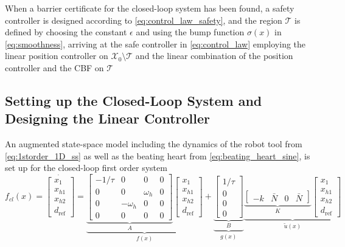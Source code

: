 When a barrier certificate for the closed-loop system has been found, a safety controller is designed according to \autoref{eq:control_law_safety}, and the region $\mathcal{T}$ is defined by choosing the constant $\epsilon$ and using the bump function $\sigma(x)$ in \autoref{eq:smoothness}, arriving at the safe controller in \autoref{eq:control_law} employing the linear position controller on $\mathcal{X}_0\setminus\mathcal{T}$ and the linear combination of the position controller and the CBF on $\mathcal{T}$

\subsection{Setting up the Closed-Loop System and Designing the Linear Controller}
An augmented state-space model including the dynamics of the robot tool from \autoref{eq:1storder_1D_ss} as well as the beating heart from \autoref{eq:beating_heart_sine}, is set up for the closed-loop first order system
\begin{equation}
f_{cl}(x)=\dot{\begin{bmatrix}
	x_1\\x_{h1}\\x_{h2}\\d_\text{ref}
	\end{bmatrix}} =
\underbrace{\underbrace{\begin{bmatrix}
		-1/\tau & 0 & 0 & 0\\0 & 0 & \omega_h & 0 \\ 0 & -\omega_h & 0 & 0 \\ 0& 0 & 0 & 0
		\end{bmatrix}}_{A}
	\begin{bmatrix}
	x_1\\x_{h1}\\x_{h2}\\d_\text{ref}
	\end{bmatrix}}_{f(x)}+ 
\underbrace{\underbrace{\begin{bmatrix}
		1/\tau \\ 0 \\ 0 \\ 0
		\end{bmatrix}}_{B}}_{g(x)}
\underbrace{\underbrace{\begin{bmatrix}
		-k & \bar{N} & 0 & \bar{N}
		\end{bmatrix}}_{K}
	\begin{bmatrix}
	x_1\\x_{h1}\\x_{h2}\\d_\text{ref}
	\end{bmatrix}}_{\tilde{u}(x)}
\end{equation}
